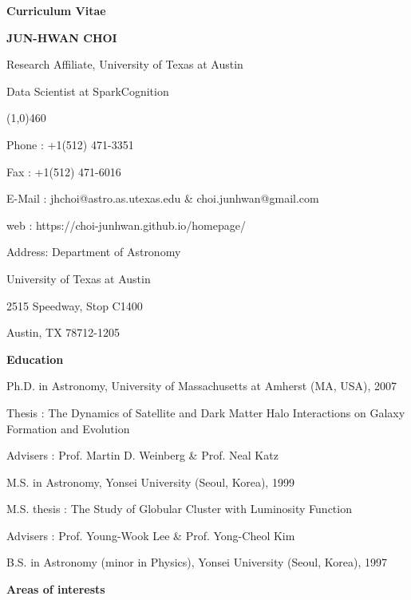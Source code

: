 \documentclass [11pt]{article}
\begin{document}
{\centerline {\textbf{Curriculum Vitae}}}

\vspace{.1in}
{\centerline {\Large \textbf{JUN-HWAN CHOI}}


\vspace{.1in}
\noindent
{\centerline {Research  Affiliate, University of Texas at Austin}}
{\centerline {Data Scientist at SparkCognition}}
\line(1,0){460}

\vspace{.2in}
\noindent 
Phone  : +1(512) 471-3351

\noindent
Fax    : +1(512) 471-6016

\noindent 
E-Mail : jhchoi@astro.as.utexas.edu \& choi.junhwan@gmail.com

\noindent 
web : https://choi-junhwan.github.io/homepage/

\noindent 
Address: Department of Astronomy

\hspace{.35in} University of Texas at Austin

\hspace{.35in} 2515 Speedway, Stop C1400

\hspace{.35in} Austin, TX 78712-1205 


\vspace{.2in}
\noindent \textbf{Education}

\vspace{.05in}
\noindent
Ph.D. in Astronomy, University of Massachusetts at Amherst (MA, USA), 2007 

Thesis : The Dynamics of Satellite and Dark Matter Halo Interactions on Galaxy Formation and Evolution

Advisers : Prof. Martin D. Weinberg \& Prof. Neal Katz 

\vspace{.02in}
\noindent 
M.S. in Astronomy, Yonsei University (Seoul, Korea), 1999 

M.S. thesis : The Study of Globular Cluster with Luminosity Function 

Advisers : Prof. Young-Wook Lee \& Prof. Yong-Cheol Kim 

\vspace{.02in}
\noindent 
B.S. in Astronomy (minor in Physics), Yonsei University (Seoul, Korea), 1997 

\vspace{.2in}
\noindent \textbf{Areas of interests}

}
\end{document}
